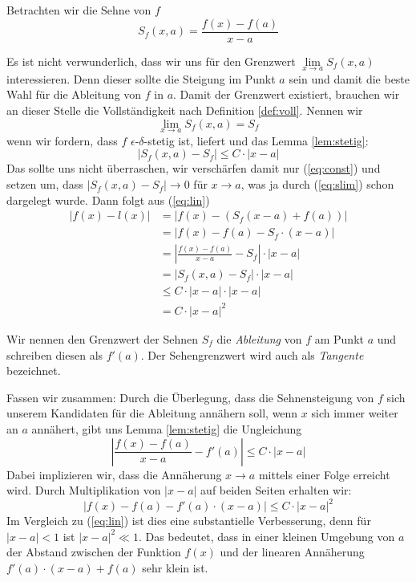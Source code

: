 Betrachten wir die Sehne von $f$
\begin{equation*}
S_f(x,a) = \frac{f(x)-f(a)}{x-a}
\end{equation*}

Es ist nicht verwunderlich, dass wir uns für den Grenzwert $\lim\limits_{x\rightarrow a} S_f(x,a)$ interessieren. Denn dieser sollte die Steigung im Punkt $a$ sein und damit die beste Wahl für die Ableitung von $f$ in $a$. Damit der Grenzwert existiert, brauchen wir an dieser Stelle die Vollständigkeit nach Definition \ref{def:voll}. Nennen wir 
\begin{equation}\label{eq:slim}
\lim\limits_{x\rightarrow a} S_f(x,a) = S_f
\end{equation}
wenn wir fordern, dass $f$ $\epsilon$-$\delta$-stetig ist, liefert und das Lemma \ref{lem:stetig}: 
\[
|S_f(x,a) - S_f| \le C\cdot |x-a|
\]
Das sollte uns nicht überraschen, wir verschärfen damit nur (\ref{eq:const}) und setzen um, dass $|S_f(x,a) - S_f| \rightarrow 0$ für $x\rightarrow a$, was ja durch (\ref{eq:slim}) schon dargelegt wurde.
Dann folgt aus (\ref{eq:lin})
\begin{equation}
\begin{split}
|f(x)-l(x)| &= |f(x)-(S_f(x-a)+f(a))| \\
&= |f(x)-f(a) -S_f\cdot (x-a)| \\
&= \left| \frac{f(x)-f(a)}{x-a} -S_f \right| \cdot |x-a| \\
&= \left| S_f(x,a) -S_f \right| \cdot |x-a| \\
&\le C\cdot |x-a| \cdot |x-a| \\
&= C\cdot |x-a|^2
\end{split}
\end{equation}

\begin{definition}\label{def:diff}
Wir nennen den Grenzwert der Sehnen $S_f$ die \textsl{Ableitung} von $f$ am Punkt $a$ und schreiben diesen als $f'(a)$. Der Sehengrenzwert wird auch als \textsl{Tangente} bezeichnet. 
\end{definition}

\bigskip

Fassen wir zusammen: Durch die Überlegung, dass die Sehnensteigung von $f$ sich unserem Kandidaten für die Ableitung annähern soll, wenn $x$ sich immer weiter an $a$ annähert, gibt uns Lemma \ref{lem:stetig} die Ungleichung
\[
\left| \frac{f(x)-f(a)}{x-a} - f'(a) \right| \le C \cdot |x-a|
\]
Dabei implizieren wir, dass die Annäherung $x\rightarrow a$ mittels einer Folge erreicht wird. Durch Multiplikation von $|x-a|$ auf beiden Seiten erhalten wir:
\[
|f(x)-f(a) -f'(a)\cdot (x-a)| \le C\cdot |x-a|^2
\]
Im Vergleich zu (\ref{eq:lin}) ist dies eine substantielle Verbesserung, denn für $|x-a|<1$ ist $|x-a|^2\ll 1$. Das bedeutet, dass in einer kleinen Umgebung von $a$ der Abstand zwischen der Funktion $f(x)$ und der linearen Annäherung $f'(a)\cdot (x-a)+f(a)$ sehr klein ist.

